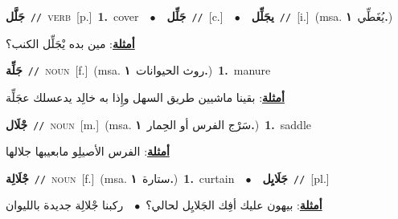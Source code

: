 \documentclass[10pt,a4paper,twoside]{article} %
\begin{document}
\begin{multicols}{2}
{\setlength\topsep{0pt}\textbf{\foreignlanguage{arabic}{جَلَّل}}\ {\color{gray}\texttt{//}\color{black}}\ \textsc{verb}\ [p.]\ \textbf{1.}~cover\ \ $\bullet$\ \ \setlength\topsep{0pt}\textbf{\foreignlanguage{arabic}{جَلِّل}}\ {\color{gray}\texttt{//}\color{black}}\ [c.]\ \ $\bullet$\ \ \setlength\topsep{0pt}\textbf{\foreignlanguage{arabic}{يجَلِّل}}\ {\color{gray}\texttt{//}\color{black}}\ [i.]\ \color{gray}(msa. \foreignlanguage{arabic}{يُغَطِّي}~\foreignlanguage{arabic}{\textbf{١.}})\color{black}\  \begin{flushright}\color{gray}\foreignlanguage{arabic}{\textbf{\underline{\foreignlanguage{arabic}{أمثلة}}}: مين بده يْجَلِّل الكنب؟}\end{flushright}\color{black}} \vspace{2mm}

{\setlength\topsep{0pt}\textbf{\foreignlanguage{arabic}{جَلِّة}}\ {\color{gray}\texttt{//}\color{black}}\ \textsc{noun}\ [f.]\ \color{gray}(msa. \foreignlanguage{arabic}{روث الحيوانات}~\foreignlanguage{arabic}{\textbf{١.}})\color{black}\ \textbf{1.}~manure\  \begin{flushright}\color{gray}\foreignlanguage{arabic}{\textbf{\underline{\foreignlanguage{arabic}{أمثلة}}}: بقينا ماشيين طريق السهل وإِذا به خالِد يدعسلك عجَلِّة}\end{flushright}\color{black}} \vspace{2mm}

{\setlength\topsep{0pt}\textbf{\foreignlanguage{arabic}{جْلَال}}\ {\color{gray}\texttt{//}\color{black}}\ \textsc{noun}\ [m.]\ \color{gray}(msa. \foreignlanguage{arabic}{سَرْج الفرس أو الحِمار}~\foreignlanguage{arabic}{\textbf{١.}})\color{black}\ \textbf{1.}~saddle\  \begin{flushright}\color{gray}\foreignlanguage{arabic}{\textbf{\underline{\foreignlanguage{arabic}{أمثلة}}}: الفرس الأصيلِو مابعيبها جلالها}\end{flushright}\color{black}} \vspace{2mm}

{\setlength\topsep{0pt}\textbf{\foreignlanguage{arabic}{جْلَالِة}}\ {\color{gray}\texttt{//}\color{black}}\ \textsc{noun}\ [f.]\ \color{gray}(msa. \foreignlanguage{arabic}{ستارة}~\foreignlanguage{arabic}{\textbf{١.}})\color{black}\ \textbf{1.}~curtain\ \ $\bullet$\ \ \setlength\topsep{0pt}\textbf{\foreignlanguage{arabic}{جَلَايِل}}\ {\color{gray}\texttt{//}\color{black}}\ [pl.]\  \begin{flushright}\color{gray}\foreignlanguage{arabic}{\textbf{\underline{\foreignlanguage{arabic}{أمثلة}}}: بيهون عليك أفِك الجَلايِل لحالي؟\ $\bullet$\ \  ركبنا جْلالِة جديدة بالليوان}\end{flushright}\color{black}} \vspace{2mm}


\end{multicols}
\end{document}
